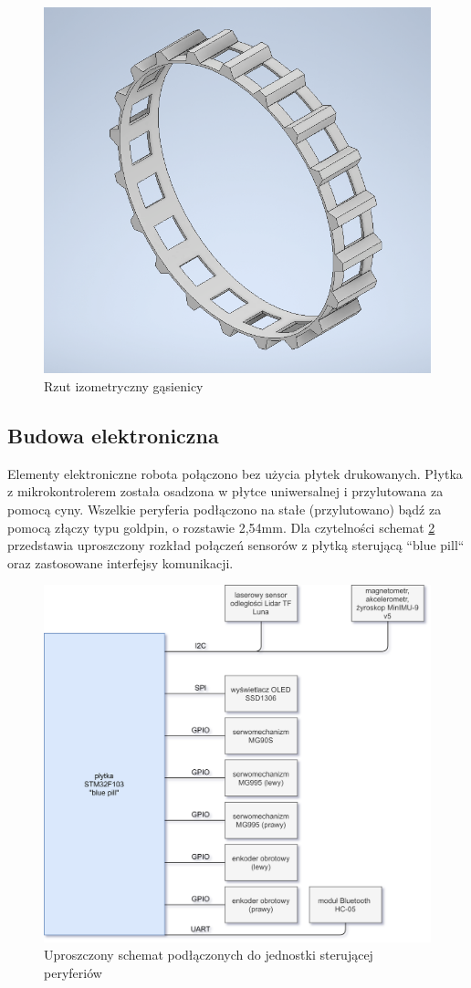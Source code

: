 \begin{figure}[H]
	\centering
		\includegraphics[width=0.6\linewidth]{rys/tracks-final.png}
	\caption{Rzut izometryczny gąsienicy}
	\label{fig:tracks}
\end{figure}


\subsection{Budowa elektroniczna}

Elementy elektroniczne robota połączono bez użycia płytek drukowanych. Płytka z mikrokontrolerem została osadzona w płytce uniwersalnej i przylutowana za pomocą cyny. Wszelkie peryferia podłączono na stałe (przylutowano) bądź za pomocą złączy typu goldpin, o rozstawie 2,54mm. Dla czytelności schemat \ref{fig:electronic-schematic-simplified} przedstawia uproszczony rozkład połączeń sensorów z płytką sterującą ``blue pill`` oraz zastosowane interfejsy komunikacji.

\begin{figure}[ht]
	\centering
		\includegraphics[width=1\linewidth]{rys/electronic-schematic.png}
	\caption{Uproszczony schemat podłączonych do jednostki sterującej peryferiów}
	\label{fig:electronic-schematic-simplified}
\end{figure}

